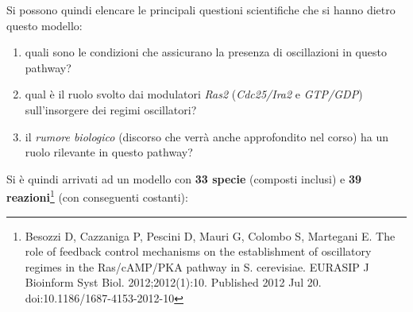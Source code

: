\documentclass[a4paper,12pt, oneside]{book}
\begin{document}
Si possono quindi elencare le principali questioni scientifiche che si hanno
dietro questo modello:
\begin{enumerate}
  \item quali sono le condizioni che assicurano la presenza di oscillazioni in
  questo pathway?
  \item qual è il ruolo svolto dai modulatori \textit{Ras2} (\textit{Cdc25/Ira2}
  e \textit{GTP/GDP}) sull'insorgere dei regimi oscillatori?
  \item il \textit{rumore biologico} (discorso che verrà anche approfondito nel
  corso) ha un ruolo rilevante in questo pathway? 
\end{enumerate}
\newpage
\noindent
Si è quindi arrivati ad un modello con \textbf{33 specie} (composti inclusi) e
\textbf{39 reazioni}\footnote{Besozzi D, Cazzaniga P, Pescini D, Mauri G,
  Colombo S, Martegani E. The role of feedback control mechanisms on the
  establishment of oscillatory regimes in the Ras/cAMP/PKA pathway in
  S. cerevisiae. EURASIP J Bioinform Syst Biol. 2012;2012(1):10. Published 2012
  Jul 20. doi:10.1186/1687-4153-2012-10} (con conseguenti costanti):
\end{document}
